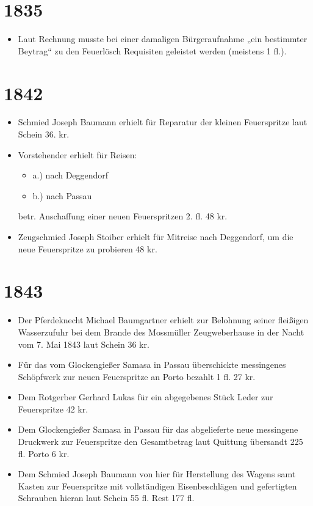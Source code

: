 \documentclass[12pt,a4paper]{book}
\begin{document}
\section*{1835}

\begin{itemize}
\item Laut Rechnung musste bei einer damaligen Bürgeraufnahme „ein bestimmter
Beytrag“ zu den Feuerlösch Requisiten geleistet werden (meistens 1 fl.).
\end{itemize}

\section*{1842}

\begin{itemize}
\item Schmied Joseph Baumann erhielt für Reparatur der kleinen Feuerspritze laut
Schein 36. kr.

\item Vorstehender erhielt für Reisen:

\begin{itemize}
\item a.) nach Deggendorf
\item b.) nach Passau
\end{itemize}

betr. Anschaffung einer neuen Feuerspritzen 2. fl. 48 kr.

\item  Zeugschmied Joseph Stoiber erhielt für Mitreise nach Deggendorf, um die
neue Feuerspritze zu probieren 48 kr.
\end{itemize}

\section*{1843}

\begin{itemize}
\item Der Pferdeknecht Michael Baumgartner erhielt zur Belohnung seiner
fleißigen Wasserzufuhr bei dem Brande des Mossmüller Zeugweberhause in der Nacht
vom 7. Mai 1843 laut Schein 36 kr.

\item Für das vom Glockengießer Samasa in Passau überschickte messingenes
Schöpfwerk zur neuen Feuerspritze an Porto bezahlt 1 fl. 27 kr.

\item Dem Rotgerber Gerhard Lukas für ein abgegebenes Stück Leder zur
Feuerspritze 42 kr.

\item Dem Glockengießer Samasa in Passau für das abgelieferte neue messingene
Druckwerk zur Feuerspritze den Gesamtbetrag laut Quittung übersandt 225 fl.
Porto 6 kr.

\item Dem Schmied Joseph Baumann von hier für Herstellung des Wagens samt Kasten
zur Feuerspritze mit vollständigen Eisenbeschlägen und gefertigten Schrauben
hieran laut Schein 55 fl. Rest 177 fl.
\end{itemize}
\end{document}
